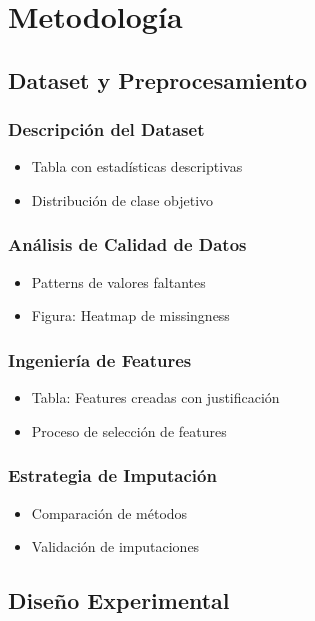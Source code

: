 \documentclass[conference]{IEEEtran}
\begin{document}
\section{Metodología}

\subsection{Dataset y Preprocesamiento}

\subsubsection{Descripción del Dataset}
\begin{itemize}
\item Tabla con estadísticas descriptivas
\item Distribución de clase objetivo
\end{itemize}
\subsubsection{Análisis de Calidad de Datos}
\label{sec:org7c78fcd}
\begin{itemize}
\item Patterns de valores faltantes
\item Figura: Heatmap de missingness
\end{itemize}
\subsubsection{Ingeniería de Features}
\begin{itemize}
\item Tabla: Features creadas con justificación
\item Proceso de selección de features
\end{itemize}
\subsubsection{Estrategia de Imputación}
\begin{itemize}
\item Comparación de métodos
\item Validación de imputaciones
\end{itemize}
\subsection{Diseño Experimental}
\label{sec:orgcecd486}
\end{document}
